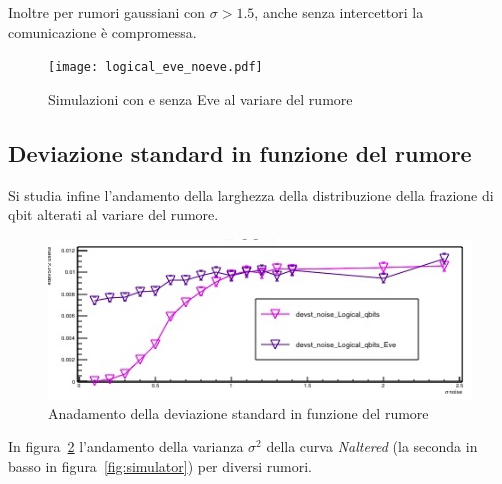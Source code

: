 \documentclass[11 pt, a4paper]{article}
\begin{document}
Inoltre per rumori gaussiani con $\sigma>1.5$, anche senza intercettori la comunicazione è compromessa.

\begin{figure}[htb!]
\centering
\texttt{[image: logical\_eve\_noeve.pdf]}
\caption{Simulazioni con e senza Eve al variare del rumore}
\label{fig:locical_eve_noeve}
\end{figure}


\subsection{Deviazione standard in funzione del rumore}
Si studia infine l'andamento della larghezza della distribuzione della frazione di qbit alterati al variare del rumore.

\begin{figure}
\centering
\includegraphics[width=0.9\linewidth]{devstVsNoise.jpeg}
\caption{Anadamento della deviazione standard in funzione del rumore}
\label{fig:devstVsNoise}
\end{figure}

In figura~\ref{fig:devstVsNoise} l'andamento della varianza $\sigma^2$ della curva \textit{Naltered} (la seconda in basso in figura~\ref{fig:simulator}) per diversi rumori.
\end{document}
